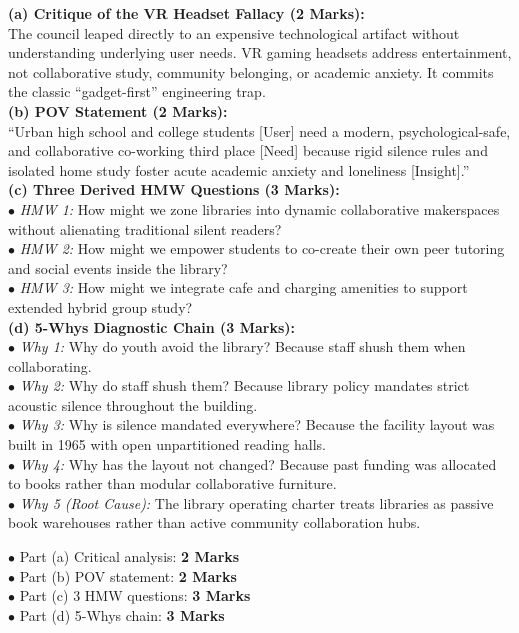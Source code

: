 \begin{solutionbox}
\textbf{(a) Critique of the VR Headset Fallacy (2 Marks):}\\
The council leaped directly to an expensive technological artifact without understanding underlying user needs. VR gaming headsets address entertainment, not collaborative study, community belonging, or academic anxiety. It commits the classic ``gadget-first'' engineering trap.\\
\textbf{(b) POV Statement (2 Marks):}\\
``Urban high school and college students [User] need a modern, psychological-safe, and collaborative co-working third place [Need] because rigid silence rules and isolated home study foster acute academic anxiety and loneliness [Insight].''\\
\textbf{(c) Three Derived HMW Questions (3 Marks):}\\
$\bullet$ \textit{HMW 1:} How might we zone libraries into dynamic collaborative makerspaces without alienating traditional silent readers?\\
$\bullet$ \textit{HMW 2:} How might we empower students to co-create their own peer tutoring and social events inside the library?\\
$\bullet$ \textit{HMW 3:} How might we integrate cafe and charging amenities to support extended hybrid group study?\\
\textbf{(d) 5-Whys Diagnostic Chain (3 Marks):}\\
$\bullet$ \textit{Why 1:} Why do youth avoid the library? Because staff shush them when collaborating.\\
$\bullet$ \textit{Why 2:} Why do staff shush them? Because library policy mandates strict acoustic silence throughout the building.\\
$\bullet$ \textit{Why 3:} Why is silence mandated everywhere? Because the facility layout was built in 1965 with open unpartitioned reading halls.\\
$\bullet$ \textit{Why 4:} Why has the layout not changed? Because past funding was allocated to books rather than modular collaborative furniture.\\
$\bullet$ \textit{Why 5 (Root Cause):} The library operating charter treats libraries as passive book warehouses rather than active community collaboration hubs.
\begin{markingrubric}
$\bullet$ Part (a) Critical analysis: \textbf{2 Marks}\\
$\bullet$ Part (b) POV statement: \textbf{2 Marks}\\
$\bullet$ Part (c) 3 HMW questions: \textbf{3 Marks}\\
$\bullet$ Part (d) 5-Whys chain: \textbf{3 Marks}
\end{markingrubric}
\end{solutionbox}
